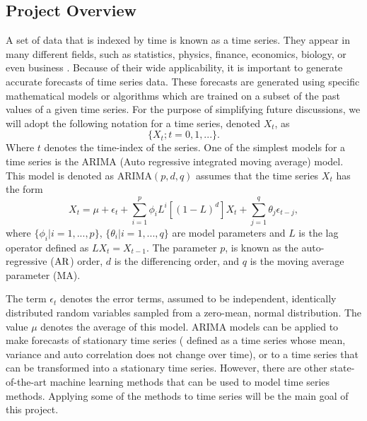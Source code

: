 \documentclass[10pt,a4paper]{article}
\begin{document}
\subsection{Project Overview}\label{sec: overview}
%
A set of data that is indexed by time is known as a time series. They appear in many different fields, such as statistics, physics, finance, economics, biology, or even business \cite{Adhikari_2013}. Because of their wide applicability, it is important to generate accurate forecasts of time series data. These forecasts are generated using specific mathematical models or algorithms which are trained on a subset of the past values of a given time series. For the purpose of simplifying future discussions, we will adopt the following notation for a time series, denoted $X_t$, as
\begin{equation}
\lbrace X_t; t=0,1,... \rbrace.
\end{equation}
Where $t$ denotes the time-index of the series. One of the simplest models for a time series is the ARIMA (Auto regressive integrated moving average) model. This model is denoted as ARIMA$(p,d,q)$ assumes that the time series $X_t$ has the form
\begin{equation}
X_{t} = \mu +\epsilon_t+ \sum_{i=1}^p \phi_i L^i \left[ (1-L)^d \right] X_{t} + \sum_{j=1}^q \theta_j \epsilon_{t-j},
\end{equation}  
where $\lbrace \phi_i | i=1,...,p \rbrace$, $\lbrace \theta_i | i=1,...,q \rbrace$ are model parameters and $L$ is the lag operator defined as $L X_t = X_{t-1} $. The parameter $p$, is known as the auto-regressive (${\rm AR}$) order, $d$ is the differencing order, and $q$ is the moving average parameter (MA). 

The term $\epsilon_{t}$ denotes the error terms, assumed to be independent, identically distributed random variables sampled from a zero-mean, normal distribution. The value $\mu$ denotes the average of this model. ARIMA models can be applied to make forecasts of stationary time series ( defined as a time series whose mean, variance and auto correlation does not change over time), or to a time series that can be transformed into a stationary time series. However, there are other state-of-the-art machine learning methods that can be used to model time series methods. Applying some of the methods to time series will be the main goal of this project.
\end{document}
